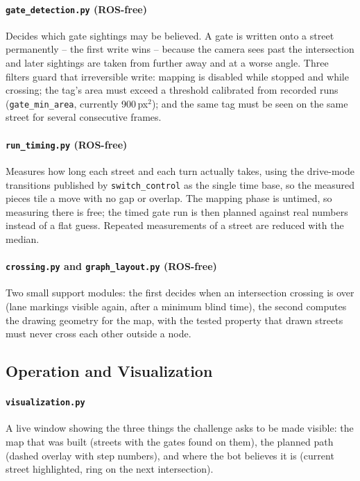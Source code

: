 \documentclass[10pt,a4paper]{article}
\begin{document}
\paragraph{\texttt{gate\_detection.py} (ROS-free)} Decides which gate sightings
may be believed. A gate is written onto a street permanently -- the first write
wins -- because the camera sees past the intersection and later sightings are
taken from further away and at a worse angle. Three filters guard that
irreversible write: mapping is disabled while stopped and while crossing; the
tag's area must exceed a threshold calibrated from recorded runs
(\texttt{gate\_min\_area}, currently 900\,px$^2$); and the same tag must be seen
on the same street for several consecutive frames.

\paragraph{\texttt{run\_timing.py} (ROS-free)} Measures how long each street and
each turn actually takes, using the drive-mode transitions published by
\texttt{switch\_control} as the single time base, so the measured pieces tile a
move with no gap or overlap. The mapping phase is untimed, so measuring there is
free; the timed gate run is then planned against real numbers instead of a flat
guess. Repeated measurements of a street are reduced with the median.

\paragraph{\texttt{crossing.py} and \texttt{graph\_layout.py} (ROS-free)} Two
small support modules: the first decides when an intersection crossing is over
(lane markings visible again, after a minimum blind time), the second computes
the drawing geometry for the map, with the tested property that drawn streets
must never cross each other outside a node.

\subsection{Operation and Visualization}

\paragraph{\texttt{visualization.py}} A live window showing the three things the
challenge asks to be made visible: the map that was built (streets with the
gates found on them), the planned path (dashed overlay with step numbers), and
where the bot believes it is (current street highlighted, ring on the next
intersection).
\end{document}
